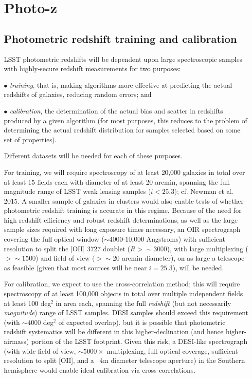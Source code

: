 
\section{Photo-z}
\label{sec:photoz}

\subsection{Photometric redshift training and calibration}\label{subsec:training}

LSST photometric redshifts will be dependent upon large spectroscopic samples with highly-secure redshift measurements for two purposes: 

$\bullet$ {\it training}, that is, making algorithms more effective at predicting the actual redshifts of galaxies, reducing random errors; and 

$\bullet$ {\it calibration}, the determination of the actual bias and scatter in redshifts produced by a given algorithm (for most purposes, this reduces to the problem of determining the actual redshift distribution for samples selected based on some set of properties).  

Different datasets will be needed for each of these purposes.

For training, we will require spectroscopy of at least 20,000 galaxies in total over at least 15 fields each with diameter of at least 20 arcmin, spanning the full magnitude range of LSST weak lensing samples ($i<25.3$); cf. Newman et al. 2015.  A smaller sample of galaxies in clusters would also enable tests of whether photometric redshift training is accurate in this regime.  Because of the need for high redshift efficiency and robust redshift determinations, as well as the large sample sizes required with long exposure times necessary, an OIR spectrograph covering the full optical window ($\sim$4000-10,000 Angstroms) with sufficient resolution to split the [OII] 3727 doublet ($R>\sim 3000$), with large multiplexing ($>\sim 1500$) and field of view ($>\sim 20$ arcmin diameter), on as large a telescope as feasible (given that most sources will be near $i=25.3$), will be needed.  

For calibration, we expect to use the cross-correlation method; this will require spectroscopy of at least 100,000 objects in total over multiple independent fields at least 100 deg$^2$ in area each, spanning the full {\em redshift} (but not necessarily {\em magnitude}) range of LSST samples.  DESI samples should exceed this requirement (with $\sim 4000$ deg$^2$ of expected overlap), but it is possible that photometric redshift systematics will be different in this higher-declination (and hence higher-airmass) portion of the LSST footprint.   Given this risk, a DESI-like spectrograph (with wide field of view, $\sim 5000\times$ multiplexing, full optical coverage, sufficient resolution to split [OII], and a ~4m diameter telescope aperture) in the Southern hemisphere would enable ideal calibration via cross-correlations.  

